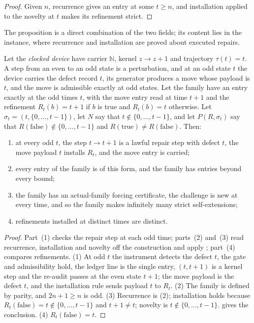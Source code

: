 \begin{proof}
Given $n$, recurrence gives an entry at some $t \ge n$, and installation applied to the novelty at
$t$ makes its refinement strict.
\end{proof}

The proposition is a direct combination of the two fields; its content lies in the instance, where
recurrence and installation are proved about executed repairs.

\begin{theorem}\label{thm:e1-clocked}
Let the \emph{clocked device} have carrier $\mathbb N$, kernel $z \to z + 1$ and trajectory
$\tau(t) = t$. A step from an even to an odd state is a perturbation, and at an odd state $t$ the
device carries the defect record $t$, its generator produces a move whose payload is $t$, and the
move is admissible exactly at odd states. Let the family have an entry exactly at the odd times $t$,
with the move entry read at time $t + 1$ and the refinement $R_t(b) = t + 1$ if $b$ is true and
$R_t(b) = t$ otherwise. Let $\sigma_t = (t, \{0, \dots, t - 1\})$, let $N$ say that $t \notin \{0,
\dots, t-1\}$, and let $P(R, \sigma_t)$ say that $R(\text{false}) \notin \{0, \dots, t-1\}$ and
$R(\text{true}) \ne R(\text{false})$. Then:
\begin{enumerate}
  \item at every odd $t$, the step $t \to t + 1$ is a lawful repair step with defect $t$, the move
    payload $t$ installs $R_t$, and the move entry is carried;
  \item every entry of the family is of this form, and the family has entries beyond every bound;
  \item the family has an actual-family forcing certificate, the challenge is new at every time,
    and so the family makes infinitely many strict self-extensions;
  \item refinements installed at distinct times are distinct.
\end{enumerate}
\end{theorem}

\begin{proof}
Part~(1) checks the repair step at each odd time; parts~(2) and~(3) read recurrence, installation and novelty off the construction and apply ; part~(4) compares refinements.
(1) At odd $t$ the instrument detects the defect $t$, the gate and admissibility hold, the ledger
line is the single entry, $(t, t + 1)$ is a kernel step and the re-audit passes at the even state
$t + 1$; the move payload is the defect $t$, and the installation rule sends payload $t$ to $R_t$.
(2) The family is defined by parity, and $2n + 1 \ge n$ is odd. (3) Recurrence is (2); installation
holds because $R_t(\text{false}) = t \notin \{0, \dots, t - 1\}$ and $t + 1 \ne t$; novelty is
$t \notin \{0, \dots, t - 1\}$.  gives the conclusion. (4) $R_t(\text{false})
= t$.
\end{proof}

